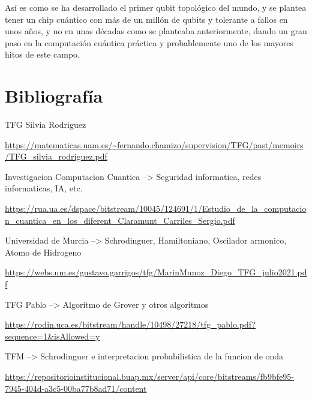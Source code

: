 \documentclass{article}
\begin{document}
    \vspace{5mm}

    Así es como se ha desarrollado el primer qubit topológico del mundo, y se plantea tener un chip cuántico con más de un millón de qubits y tolerante a fallos en unos años, y no en unas décadas como se planteaba anteriormente, dando un gran paso en la computación cuántica práctica y probablemente uno de los mayores hitos de este campo.

    \newpage
    \thispagestyle{empty}
    \mbox{}
    \newpage

    \section{Bibliografía}

        \vspace{5mm}

        TFG Silvia Rodriguez\par
        \url{https://matematicas.uam.es/~fernando.chamizo/supervision/TFG/past/memoirs/TFG\_silvia\_rodriguez.pdf}
        \vspace{2mm}

        Investigacion Computacion Cuantica --> Seguridad informatica, redes informaticas, IA, etc.\par
        \url{https://rua.ua.es/dspace/bitstream/10045/124691/1/Estudio\_de\_la\_computacion\_cuantica\_en\_los\_diferent\_Claramunt\_Carriles\_Sergio.pdf}
        \vspace{2mm}

        Universidad de Murcia --> Schrodinguer, Hamiltoniano, Oscilador armonico, Atomo de Hidrogeno\par
        \url{https://webs.um.es/gustavo.garrigos/tfg/MarinMunoz\_Diego\_TFG\_julio2021.pdf}
        \vspace{2mm}

        TFG Pablo --> Algoritmo de Grover y otros algoritmos\par
        \url{https://rodin.uca.es/bitstream/handle/10498/27218/tfg\_pablo.pdf?sequence=1\&isAllowed=y}
        \vspace{2mm}

        TFM --> Schrodinguer e interpretacion probabilistica de la funcion de onda\par
        \url{https://repositorioinstitucional.buap.mx/server/api/core/bitstreams/fb9bfe95-7945-404d-a3c5-00ba77b8ad71/content}
        \vspace{2mm}
\end{document}
